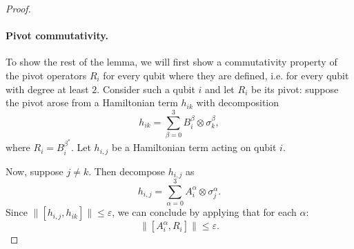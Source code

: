 \documentclass[11pt]{article}
\theoremstyle{plain}
\newcommand{\eps}{\varepsilon}
\newcommand{\IslamNote}[1]{\textcolor{orange}{(Islam: #1)}}
\newcommand{\IslamNote}[1]{}
\begin{document}
\begin{proof}
\paragraph{Pivot commutativity.}

To show the rest of the lemma, we will first show a commutativity property of the pivot operators $R_i$ for every qubit where they are defined, i.e. for every qubit with degree at least $2$. Consider such a qubit $i$ and let $R_i$ be its pivot: suppose the pivot arose from a Hamiltonian term $h_{ik}$ with decomposition
\begin{equation}
    h_{ik} = \sum_{\beta=0}^3 B_i^\beta \otimes \sigma_k^\beta,
\end{equation}
where $R_i = B_i^{\beta^*}$. Let $h_{i,j}$ be a Hamiltonian term acting on qubit $i$.

Now, suppose $j \neq k$. Then decompose $h_{i,j}$ as
\begin{equation}
    h_{i,j}  = \sum_{\alpha=0}^3 A_i^\alpha \otimes \sigma_j^\alpha. 
\end{equation}
Since $\|[h_{i,j},h_{ik}]\| \leq \eps$, we can conclude by applying  that for each $\alpha$:
\begin{equation}
 \| [A_i^\alpha, R_i] \| \leq \eps. \label{eq:pivot-commutes-different-term}
\end{equation}



\end{proof}
\end{document}
